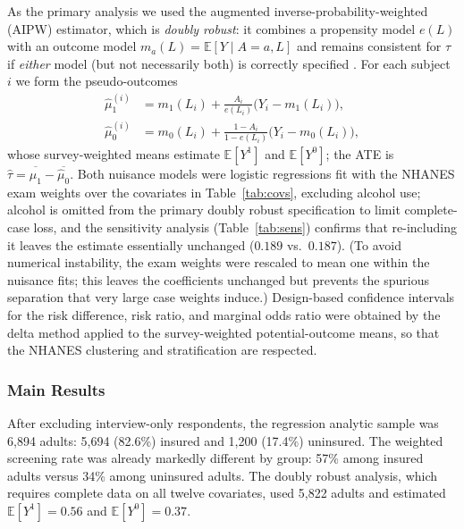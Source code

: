\documentclass[12pt]{article}
\begin{document}
As the primary analysis we used the augmented inverse-probability-weighted
(AIPW) estimator, which is \emph{doubly robust}: it combines a propensity model
$e(L)$ with an outcome model $m_a(L) = \mathbb{E}[Y \mid A = a, L]$ and remains
consistent for $\tau$ if \emph{either} model (but not necessarily both) is
correctly specified \cite{robins1994, bang2005, funk2011}. For each subject $i$
we form the pseudo-outcomes
\begin{align}
\hat\mu_1^{(i)} &= m_1(L_i) + \frac{A_i}{e(L_i)}\bigl(Y_i - m_1(L_i)\bigr),\\
\hat\mu_0^{(i)} &= m_0(L_i) + \frac{1-A_i}{1-e(L_i)}\bigl(Y_i - m_0(L_i)\bigr),
\end{align}
whose survey-weighted means estimate $\mathbb{E}[Y^{1}]$ and $\mathbb{E}[Y^{0}]$;
the ATE is $\hat\tau = \overline{\hat\mu_1} - \overline{\hat\mu_0}$. Both nuisance
models were logistic regressions fit with the NHANES exam weights over the
covariates in Table~\ref{tab:covs}, excluding alcohol use; alcohol is omitted
from the primary doubly robust specification to limit complete-case loss, and the
sensitivity analysis (Table~\ref{tab:sens}) confirms that re-including it leaves
the estimate essentially unchanged ($0.189$ vs.\ $0.187$). (To avoid numerical instability, the exam
weights were rescaled to mean one within the nuisance fits; this leaves the
coefficients unchanged but prevents the spurious separation that very large case
weights induce.) Design-based confidence intervals for the risk difference, risk
ratio, and marginal odds ratio were obtained by the delta method applied to the
survey-weighted potential-outcome means, so that the NHANES clustering and
stratification are respected.

\subsubsection{Main Results}

After excluding interview-only respondents, the regression analytic sample was
6{,}894 adults: 5{,}694 (82.6\%) insured and 1{,}200 (17.4\%) uninsured. The
weighted screening rate was already markedly different by group: 57\% among
insured adults versus 34\% among uninsured adults. The doubly robust analysis,
which requires complete data on all twelve covariates, used 5{,}822 adults and
estimated $\mathbb{E}[Y^{1}] = 0.56$ and $\mathbb{E}[Y^{0}] = 0.37$.
\end{document}
